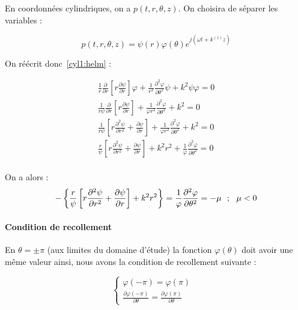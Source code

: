 \documentclass[11pt]{article}
\renewcommand{\phi}\varphi
\begin{document}
En coordonnées cylindriques, on a $p(t,r,\theta,z)$. On choisira de séparer les variables :

$$p(t,r,\theta,z) = \psi(r)\phi(\theta)e^{j(\omega t+k^{(z)}z)}$$

On réécrit donc~\eqref{cyl1:helm} :

\begin{equation*}
\begin{array}{c}
\frac{1}{r}\frac{\partial}{\partial r}\left[r\frac{\partial\psi}{\partial r}\right]\phi +
\frac{1}{r^2}\frac{\partial^2\phi}{\partial\theta^2}\psi+k^2\psi\phi = 0\\
%
\frac{1}{r\psi}\frac{\partial}{\partial r}\left[r\frac{\partial\psi}{\partial r}\right] +
\frac{1}{\phi r^2}\frac{\partial^2\phi}{\partial\theta^2}+k^2 = 0\\
%
\frac{1}{r\psi}\left[r\frac{\partial^2\psi}{\partial r^2}+\frac{\partial\psi}{\partial r}\right] +
\frac{1}{\phi r^2}\frac{\partial^2\phi}{\partial\theta^2}+k^2 = 0\\
%
\frac{r}{\psi}\left[r\frac{\partial^2\psi}{\partial r^2}+\frac{\partial\psi}{\partial r}\right] + k^2r^2 +
\frac{1}{\phi}\frac{\partial^2\phi}{\partial\theta^2} = 0\\
\end{array}
\end{equation*}

On a alors :
\begin{equation}
-\left\{\frac{r}{\psi}\left[r\frac{\partial^2\psi}{\partial r^2}+\frac{\partial\psi}{\partial r}\right] + k^2r^2\right\} =
\frac{1}{\phi}\frac{\partial^2\phi}{\partial\theta^2} = -\mu ~~;~~ \mu < 0\label{cyl1:sepvar}\\
\end{equation}

\paragraph{Condition de recollement} En $\theta=\pm\pi$ (aux limites du domaine d'étude) la fonction $\phi(\theta)$ doit
avoir une même valeur ainsi, nous avons la condition de recollement suivante :

\begin{equation}
\begin{cases}
    \phi(-\pi) = \phi(\pi)&\\
    \frac{\partial\phi(-\pi)}{\partial \theta} = \frac{\partial\phi(\pi)}{\partial \theta}&
\end{cases}\label{}
\end{equation}
\end{document}
